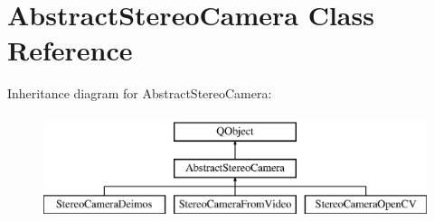 \hypertarget{class_abstract_stereo_camera}{}\section{Abstract\+Stereo\+Camera Class Reference}
\label{class_abstract_stereo_camera}
Inheritance diagram for Abstract\+Stereo\+Camera\+:\begin{figure}[H]
\begin{center}
\leavevmode
\includegraphics[height=3.000000cm]{class_abstract_stereo_camera}
\end{center}
\end{figure}
